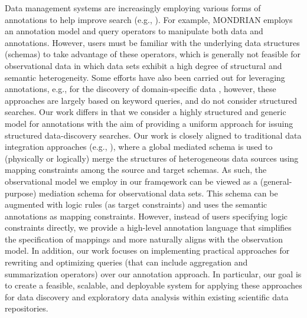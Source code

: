 Data management systems are increasingly employing various forms of
annotations to help improve search (e.g.,
\cite{DBLP:conf/icde/GeertsKM06,Reeve05SemanticAnnotation,DBLP:conf/vldb/Bhagwat
  CTV04}). For example, MONDRIAN \cite{DBLP:conf/icde/GeertsKM06}
employs an annotation model and query operators to manipulate both
data and annotations.  However, users must be familiar with the
underlying data structures (schemas) to take advantage of these
operators, which is generally not feasible for observational data in
which data sets exhibit a high degree of structural and semantic
heterogeneity.  Some efforts have also been carried out for leveraging
annotations, e.g., for the discovery of domain-specific data
\cite{obsdatasearch09,DBLP:conf/icde/StoyanovichMR10}, however, these
approaches are largely based on keyword queries, and do not consider
structured searches. Our work differs in that we consider a highly
structured and generic model for annotations with the aim of providing
a uniform approach for issuing structured data-discovery searches. Our
work is closely aligned to traditional data integration approaches
(e.g., \cite{HalevyDataIntegration06,kolaitis05}), where a global
mediated schema is used to (physically or logically) merge the
structures of heterogeneous data sources using mapping constraints
among the source and target schemas. As such, the observational model
we employ in our framqework can be viewed as a (general-purpose)
mediation schema for observational data sets.  This schema can be
augmented with logic rules (as target constraints) and uses the
semantic annotations as mapping constraints. However, instead of users
specifying logic constraints directly, we provide a high-level
annotation language that simplifies the specification of mappings and
more naturally aligns with the observation model. In addition, our
work focuses on implementing practical approaches for rewriting and
optimizing queries (that can include aggregation and summarization
operators) over our annotation approach.  In particular, our goal is
to create a feasible, scalable, and deployable system for applying
these approaches for data discovery and exploratory data analysis
within existing scientific data repositories.



